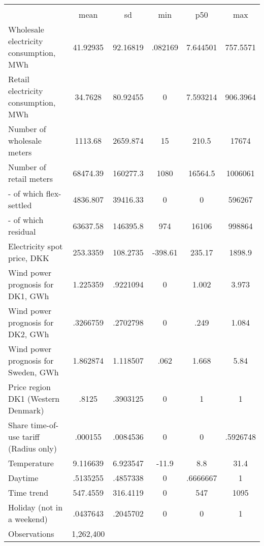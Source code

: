 \begin{tabular}{l*{1}{ccccc}}
\hline\hline
                    &\multicolumn{5}{c}{}                                            \\
                    &        mean&          sd&         min&         p50&         max\\
\midrule
Wholesale electricity consumption, MWh&    41.92935&    92.16819&     .082169&    7.644501&    757.5571\\
Retail electricity consumption, MWh&     34.7628&    80.92455&           0&    7.593214&    906.3964\\
Number of wholesale meters&     1113.68&    2659.874&          15&       210.5&       17674\\
Number of retail meters&    68474.39&    160277.3&        1080&     16564.5&     1006061\\
- of which flex-settled&    4836.807&    39416.33&           0&           0&      596267\\
- of which residual &    63637.58&    146395.8&         974&       16106&      998864\\
Electricity spot price, DKK&    253.3359&    108.2735&     -398.61&      235.17&      1898.9\\
Wind power prognosis for DK1, GWh&    1.225359&    .9221094&           0&       1.002&       3.973\\
Wind power prognosis for DK2, GWh&    .3266759&    .2702798&           0&        .249&       1.084\\
Wind power prognosis for Sweden, GWh&    1.862874&    1.118507&        .062&       1.668&        5.84\\
Price region DK1 (Western Denmark)&       .8125&    .3903125&           0&           1&           1\\
Share time-of-use tariff (Radius only)&     .000155&    .0084536&           0&           0&    .5926748\\
Temperature         &    9.116639&    6.923547&       -11.9&         8.8&        31.4\\
Daytime             &    .5135255&    .4857338&           0&    .6666667&           1\\
Time trend          &    547.4559&    316.4119&           0&         547&        1095\\
Holiday (not in a weekend)&    .0437643&    .2045702&           0&           0&           1\\
\midrule
Observations        &   1,262,400&            &            &            &            \\
\bottomrule\end{tabular}
